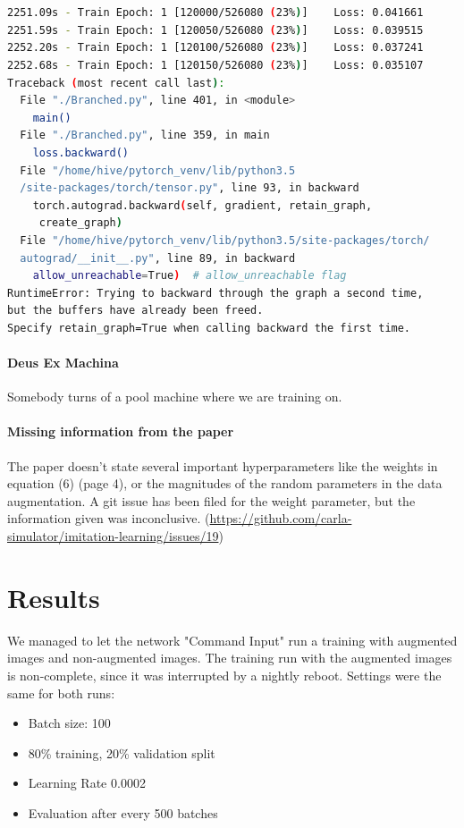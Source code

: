 \documentclass[a4paper]{article}
\begin{document}
\begin{lstlisting}[language=bash, caption={Nigthly Reboot Interruption}]


2251.09s - Train Epoch: 1 [120000/526080 (23%)]    Loss: 0.041661
2251.59s - Train Epoch: 1 [120050/526080 (23%)]    Loss: 0.039515
2252.20s - Train Epoch: 1 [120100/526080 (23%)]    Loss: 0.037241
2252.68s - Train Epoch: 1 [120150/526080 (23%)]    Loss: 0.035107
Traceback (most recent call last):
  File "./Branched.py", line 401, in <module>
    main()
  File "./Branched.py", line 359, in main
    loss.backward()
  File "/home/hive/pytorch_venv/lib/python3.5
  /site-packages/torch/tensor.py", line 93, in backward
    torch.autograd.backward(self, gradient, retain_graph,
     create_graph)
  File "/home/hive/pytorch_venv/lib/python3.5/site-packages/torch/
  autograd/__init__.py", line 89, in backward
    allow_unreachable=True)  # allow_unreachable flag
RuntimeError: Trying to backward through the graph a second time, 
but the buffers have already been freed. 
Specify retain_graph=True when calling backward the first time.

\end{lstlisting}

\paragraph{Deus Ex Machina} Somebody turns of a pool machine where we are
training on.

\paragraph{Missing information from the paper} The paper doesn't state several
important hyperparameters like the weights in equation (6) (page 4), or the
magnitudes of the random parameters in the data augmentation. A git issue has
been filed for the weight parameter, but the information given was inconclusive.
(\url{https://github.com/carla-simulator/imitation-learning/issues/19})

\section{Results}
We managed to let the network "Command Input" run a training with augmented images and non-augmented images.
The training run with the augmented images is non-complete, since it was interrupted by a nightly reboot.
Settings were the same for both runs:
\begin{itemize}
	\item Batch size: 100
	\item 80\% training, 20\% validation split
	\item Learning Rate 0.0002
	\item Evaluation after every 500 batches
  \end{itemize}
\end{document}
